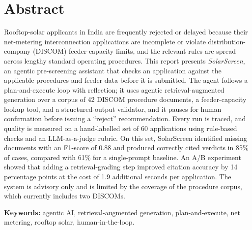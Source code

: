 \documentclass[12pt,a4paper,oneside]{report}
\newif\ifguidance
\newcommand{\guide}[1]{%
  \ifguidance
  \begin{tcolorbox}[enhanced,breakable,colback=guidebg,colframe=bmsblue,
    boxrule=0.6pt,arc=2pt,left=6pt,right=6pt,top=4pt,bottom=4pt,
    fonttitle=\bfseries\small,title={What to write here},
    before upper={\small\setstretch{1.1}}]
  #1
  \end{tcolorbox}
  \fi}
\newcommand{\dodont}[2]{%
  \ifguidance
  \begin{tcolorbox}[enhanced,breakable,sidebyside,sidebyside align=top seam,
    colback=dobg,colbacklower=dontbg,colframe=gray!60,boxrule=0.5pt,arc=2pt,
    lefthand ratio=0.5,left=5pt,right=5pt,top=4pt,bottom=4pt,
    fontupper=\small\setstretch{1.05},fontlower=\small\setstretch{1.05}]
  \textbf{\textcolor{ForestGreen}{\checkmark\ Do}}
  \begin{itemize}[leftmargin=12pt,itemsep=1pt,topsep=2pt]#1\end{itemize}
  \tcblower
  \textbf{\textcolor{BrickRed}{$\times$ Don't}}
  \begin{itemize}[leftmargin=12pt,itemsep=1pt,topsep=2pt]#2\end{itemize}
  \end{tcolorbox}
  \fi}
\newenvironment{sample}
  {\par\noindent{\footnotesize\bfseries\textcolor{BrickRed}{[SAMPLE --- replace with your own content]}}\par\color{samplecol}}
  {\par\medskip}
\begin{document}
\chapter*{Abstract}
\thispagestyle{frontmatter}
\guide{A single paragraph of 200--300 words, followed by 4--6 keywords. Answer, in order:
(1) Which sector and what decision? (2) Why is it niche and why does it need an agent rather than
a single LLM call? (3) What did you build (agent type, patterns, tools)? (4) How did you evaluate
it? (5) What is the headline result, with a number? (6) What is the main limitation?}
\dodont{\item Write it last, after all results are final.
\item Include at least one quantitative result.
\item Make it understandable without reading the report.}
{\item Do not cite references, figures or tables.
\item Do not use abbreviations without expanding them.
\item Do not exceed one paragraph or 300 words.}
\begin{sample}
Rooftop-solar applicants in India are frequently rejected or delayed because their net-metering
interconnection applications are incomplete or violate distribution-company (DISCOM) feeder-capacity
limits, and the relevant rules are spread across lengthy standard operating procedures. This report
presents \emph{SolarScreen}, an agentic pre-screening assistant that checks an application against
the applicable procedures and feeder data before it is submitted. The agent follows a
plan-and-execute loop with reflection; it uses agentic retrieval-augmented generation over a corpus of
42 DISCOM procedure documents, a feeder-capacity lookup tool, and a structured-output validator, and
it pauses for human confirmation before issuing a ``reject'' recommendation. Every run is traced,
and quality is measured on a hand-labelled set of 60 applications using rule-based checks and an
LLM-as-a-judge rubric. On this set, SolarScreen identified missing documents with an F1-score of
0.88 and produced correctly cited verdicts in 85\% of cases, compared with 61\% for a single-prompt
baseline. An A/B experiment showed that adding a retrieval-grading step improved citation accuracy by
14 percentage points at the cost of 1.9 additional seconds per application. The system is advisory
only and is limited by the coverage of the procedure corpus, which currently includes two DISCOMs.

\medskip
\noindent\textbf{Keywords:} agentic AI, retrieval-augmented generation, plan-and-execute,
net metering, rooftop solar, human-in-the-loop.
\end{sample}
\end{document}
